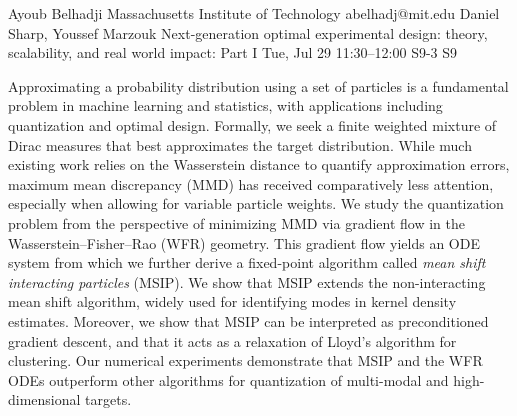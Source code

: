 \begin{talk}
  {Ayoub Belhadji}%
  {Massachusetts Institute of Technology}%
  {abelhadj@mit.edu}%
  {Daniel Sharp, Youssef Marzouk}%
  {Next-generation optimal experimental design: theory, scalability, and real world impact: Part I}%
  {}%
  {Tue, Jul 29 11:30--12:00}%
  {S9-3}%
  {S9}%
    
   
Approximating a probability distribution using a set of particles is a fundamental problem in machine learning and statistics, with applications including  quantization and optimal design. Formally, we seek a finite weighted mixture of Dirac measures that best approximates the target distribution. While much existing work relies on the Wasserstein distance to quantify approximation errors, maximum mean discrepancy (MMD) has received comparatively less attention, especially when allowing for variable particle weights. We study the quantization problem from the perspective of minimizing MMD via gradient flow in the Wasserstein--Fisher--Rao (WFR) geometry. This gradient flow yields an ODE system from which we further derive a fixed-point algorithm called \emph{mean shift interacting particles} (MSIP). We show that MSIP extends the non-interacting mean shift algorithm, widely used for identifying modes in kernel density estimates. Moreover, we show that MSIP can be interpreted as preconditioned gradient descent, and that it acts as a relaxation of Lloyd's algorithm for clustering. 
Our numerical experiments demonstrate that MSIP and the WFR ODEs outperform other algorithms for quantization of multi-modal and high-dimensional targets.
\medskip


\end{talk}

